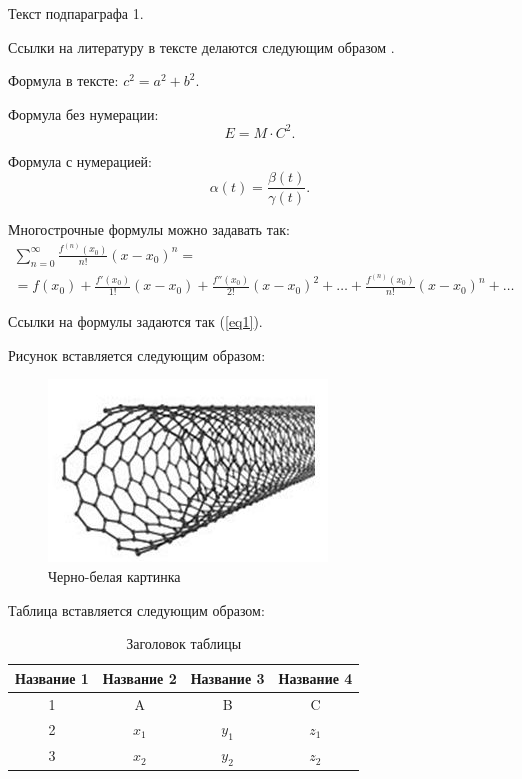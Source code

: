 \documentclass{nsart_eng}
\begin{document}
Текст подпараграфа 1.

Ссылки на литературу в тексте делаются следующим образом
\cite{1,4}.

Формула в тексте: $c^2=a^2+b^2$.

Формула без нумерации:
$$
E=M \cdot C^2.
$$

Формула с нумерацией:
\begin{equation} \label{eq1}
\alpha (t) = \frac{ \beta (t)}{\gamma (t)}.
\end{equation}

Многострочные формулы можно задавать так:
\begin{multline} \label{eq2}
\sum\limits_{n=0}^\infty  {\frac{{f^{\left( n \right)} \left( {x_0 } \right)}}{{n!}}\left( {x - x_0 } \right)^n }  = \\
= f\left( {x_0 } \right) + \frac{{f'\left( {x_0 }
\right)}}{{1!}}\left( {x - x_0 } \right) +
 \frac{{f''\left( {x_0 } \right)}}{{2!}}\left( {x - x_0 } \right)^2 + \dots +
 \frac{{f^{\left( n \right)} \left( {x_0 } \right)}}{{n!}}\left( {x - x_0 } \right)^n  + \dots
\end{multline}

Ссылки на формулы задаются так  (\ref{eq1}).

Рисунок вставляется следующим образом:


\begin{figure}
\includegraphics{fig1.png}
\caption{Черно-белая картинка}
\end{figure}




Таблица вставляется следующим образом:
\begin{table}[htbp]
\caption{Заголовок таблицы}
\begin{tabular}
{|c||c|c|c|} \hline Название 1 & Название 2 & Название 3 & Название 4\\
\hline \hline 1 & A & B & C \\ \hline 2 & $x_1$ & $y_1$ & $z_1$ \\
\hline 3 & $x_2$ & $y_2$ & $z_2$ \\ \hline
\end{tabular}
\end{table}
\end{document}
